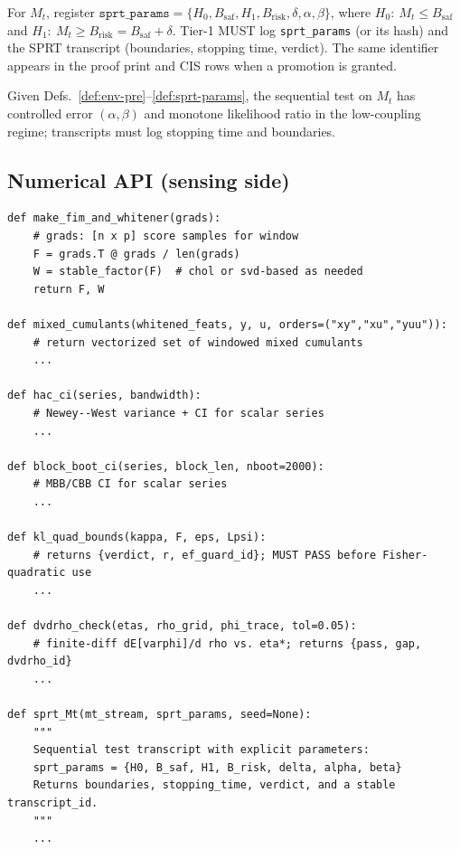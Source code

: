 \begin{definition}\label{def:sprt-params}
For $M_t$, register $\texttt{sprt\_params}=\{H_0,B_{\mathrm{saf}},H_1,B_{\mathrm{risk}},\delta,\alpha,\beta\}$, where $H_0:\ M_t\le B_{\mathrm{saf}}$ and $H_1:\ M_t\ge B_{\mathrm{risk}}=B_{\mathrm{saf}}+\delta$. Tier-1 MUST log \texttt{sprt\_params} (or its hash) and the SPRT transcript (boundaries, stopping time, verdict). The same identifier appears in the proof print and CIS rows when a promotion is granted.
\end{definition}

\begin{lemma}\label{lem:sprt-wellposed}
Given Defs.~\ref{def:env-pre}–\ref{def:sprt-params}, the sequential test on $M_t$ has controlled error $(\alpha,\beta)$ and monotone likelihood ratio in the low-coupling regime; transcripts must log stopping time and boundaries.
\end{lemma}

\subsection{Numerical API (sensing side)}\label{subsec:api-sense}
\emph{}
\begin{lstlisting}
def make_fim_and_whitener(grads):
    # grads: [n x p] score samples for window
    F = grads.T @ grads / len(grads)
    W = stable_factor(F)  # chol or svd-based as needed
    return F, W

def mixed_cumulants(whitened_feats, y, u, orders=("xy","xu","yuu")):
    # return vectorized set of windowed mixed cumulants
    ...

def hac_ci(series, bandwidth):
    # Newey--West variance + CI for scalar series
    ...

def block_boot_ci(series, block_len, nboot=2000):
    # MBB/CBB CI for scalar series
    ...

def kl_quad_bounds(kappa, F, eps, Lpsi):
    # returns {verdict, r, ef_guard_id}; MUST PASS before Fisher-quadratic use
    ...

def dvdrho_check(etas, rho_grid, phi_trace, tol=0.05):
    # finite-diff dE[varphi]/d rho vs. eta*; returns {pass, gap, dvdrho_id}
    ...

def sprt_Mt(mt_stream, sprt_params, seed=None):
    """
    Sequential test transcript with explicit parameters:
    sprt_params = {H0, B_saf, H1, B_risk, delta, alpha, beta}
    Returns boundaries, stopping_time, verdict, and a stable transcript_id.
    """
    ...
\end{lstlisting}

